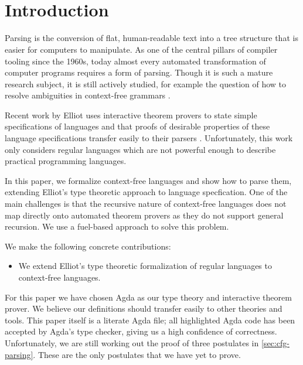 \begin{code}[hide]%
\>[0]\AgdaSymbol{\{-\#}\AgdaSpace{}%
\AgdaSpace{}%
\AgdaSpace{}%
\AgdaSpace{}%
\AgdaSymbol{\#-\}}\<%
\\
\>[0]\AgdaSpace{}%
\AgdaSpace{}%
\<%
\\
\>[0]\<%
\end{code}

\section{Introduction}

Parsing is the conversion of flat, human-readable text into a tree structure
that is easier for computers to manipulate.  As one of the central
pillars of compiler tooling since the 1960s, today almost every automated
transformation of computer programs requires a form of parsing.
Though it is such a mature research subject, it is still actively studied, for example the question of how to resolve ambiguities in context-free grammars \cite{one-parser-to-rule-them-all}. 

Recent work by Elliot uses interactive theorem provers to state simple specifications of languages and that proofs of desirable properties of these language specifications transfer easily to their parsers \cite{conal-languages}. Unfortunately, this work only considers regular languages which are not powerful enough to describe practical programming languages.

In this paper, we formalize context-free languages and show how to parse them, extending Elliot’s type theoretic approach to language specfication.  One of the main challenges is that the recursive nature of context-free languages does not map directly onto automated theorem provers as they do not support general recursion. We use a fuel-based approach to solve this problem.

We make the following concrete contributions:
\begin{itemize}
\item We extend Elliot's type theoretic formalization of regular languages to context-free languages.
\end{itemize}

For this paper we have chosen Agda as our type theory and interactive theorem prover. We believe our definitions should transfer easily to other theories and tools. This paper itself is a literate Agda file; all highlighted Agda code has been accepted by Agda's type checker, giving us a high confidence of correctness. Unfortunately, we are still working out the proof of three postulates in \cref{sec:cfg-parsing}. These are the only postulates that we have yet to prove.